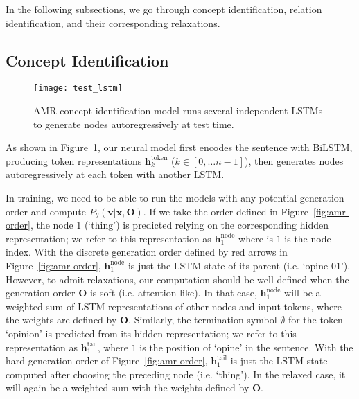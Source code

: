 \documentclass[11pt]{article}
\begin{document}
In the following subsections, we go through concept identification, relation identification, and their corresponding relaxations. 


\subsection{Concept Identification}


\begin{figure}[t!]
\centering
\texttt{[image: test\_lstm]}
\caption{AMR concept identification model runs several independent LSTMs to generate nodes autoregressively at test time.} \label{fig:seg_lstm}
\end{figure}

 As shown in Figure~\ref{fig:seg_lstm}, our neural model first encodes the sentence with $\mathrm{BiLSTM}$, producing token representations  $\mathbf{h}^{\mathrm{token}}_k$ ($k \in [0,\ldots n-1]$), then generates nodes autoregressively at each token with another $\mathrm{LSTM}$. 

 In training, we need to be able to run the models with any potential generation order and compute $P_\theta(\mathbf{v}|\mathbf{x},\mathbf{O})$. 
 If we take the order defined in Figure~\ref{fig:amr-order},
 the node 1 (`thing') is predicted 
 relying on the corresponding hidden representation;
 we refer to this representation as  $\mathbf{h}^{\mathrm{node}}_1$ where is $1$ is the node index. With the discrete generation order  defined by red arrows in Figure~\ref{fig:amr-order}, $\mathbf{h}^{\mathrm{node}}_1$  is just the LSTM state
 of its parent (i.e. `opine-01'). However, to admit relaxations, our computation should be well-defined when the generation order $\mathbf{O}$ is soft (i.e. attention-like). 
 In that case, $\mathbf{h}^{\mathrm{node}}_1$ will be a weighted sum of LSTM representations of other nodes and input tokens, where the weights are defined by $\mathbf{O}$.
 Similarly, the termination symbol $\emptyset$ for the token `opinion' is predicted from its hidden representation; we refer to this representation as  $\mathbf{h}^{\mathrm{tail}}_1$, where $1$ is the position of `opine' in the sentence. With the hard generation order of Figure~\ref{fig:amr-order}, $\mathbf{h}^{\mathrm{tail}}_1$ is just the LSTM state computed after choosing the preceding node (i.e. `thing'). In the relaxed case, it will again be a weighted sum with the weights defined by $\mathbf{O}$.
 
\end{document}
